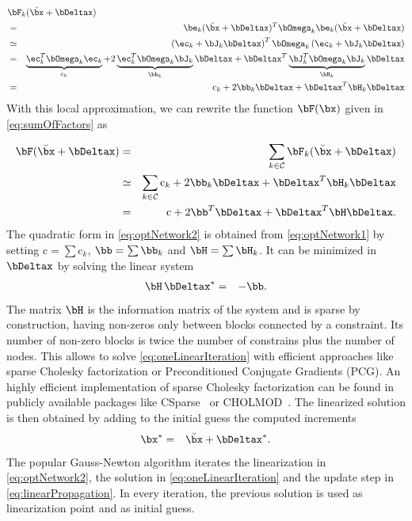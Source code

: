 \documentclass[a4paper]{article}
\begin{document}
\vspace{-3.5mm}
{\small
\begin{eqnarray}
\lefteqn{\bF_{k}(\breve{\bx} + \bDeltax) }\\
&=&  \be_{k}(\breve{\bx} + \bDeltax)^T \bOmega_{k} \be_{k}(\breve{\bx} + \bDeltax)  \\
\label{eq:errorQuad1}
             &\simeq& \left(\ec_{k} + \bJ_{k} \bDeltax \right)^T \bOmega_{k} \left(\ec_{k} + \bJ_{k} \bDeltax \right)  \\
\label{eq:errorQuad2}
             &=& \underbrace{\ec_{k}^T \bOmega_{k}\ec_{k}}_{\mathrm{c}_{k}} + 2 \underbrace{\ec_{k}^T \bOmega_{k} \bJ_{k}}_{\bb_{k}} \bDeltax +
 \bDeltax^T \underbrace{\bJ_{k}^T \bOmega_{k}\bJ_{k}}_{\bH_{k}} \bDeltax \\
             &=&\mathrm{c}_{k} + 2 \bb_{k} \bDeltax + \bDeltax^T \bH_{k} \bDeltax
\label{eq:errorQuad}
\end{eqnarray}
} 
With this local approximation, we can rewrite the function
$\bF(\bx)$ given in \eqref{eq:sumOfFactors} as

\vspace{-3.5mm}
{\small
\begin{eqnarray}
\bF(\breve{\bx} + \bDeltax) &=& \sum_{k \in\mathcal{C}} \bF_{k}(\breve{\bx} + \bDeltax) 
\label{eq:optNetwork0}\\
                      &\simeq& \sum_{k \in\mathcal{C}} \mathrm{c}_{k} + 2 \bb_{k} \bDeltax + \bDeltax^T \bH_{k} \bDeltax
\label{eq:optNetwork1}\\
                      &=&\mathrm{c} + 2 \bb^T \bDeltax + \bDeltax^T \bH \bDeltax. 
\label{eq:optNetwork2}
\end{eqnarray}
} The quadratic form in \eqref{eq:optNetwork2} is obtained from
\eqref{eq:optNetwork1} by setting $\mathrm{c}=\sum \mathrm{c}_{k}$,
$\bb=\sum \bb_{k}$ and $\bH=\sum \bH_{k}$. It can be minimized in
$\bDeltax$ by solving the linear system
\begin{eqnarray}
       \bH\,\bDeltax^* &=& - \bb. 
\label{eq:oneLinearIteration}
\end{eqnarray}
The matrix $\bH$ is the information matrix of the system and is sparse
by construction, having non-zeros only between blocks connected by a
constraint.  Its number of non-zero blocks is twice the number of
constrains plus the number of nodes. This allows to solve
\eqref{eq:oneLinearIteration} with efficient approaches like sparse
Cholesky factorization or Preconditioned Conjugate Gradients (PCG). An
highly efficient implementation of sparse Cholesky factorization can
be found in publicly available packages like CSparse~\cite{csparse} or
CHOLMOD~\cite{cholmod}.  The linearized solution is then obtained by
adding to the initial guess the computed increments
\begin{eqnarray}
  \bx^*&=&\breve{\bx}+\bDeltax^*.
\label{eq:linearPropagation}
\end{eqnarray}
The popular Gauss-Newton algorithm iterates the linearization in
\eqref{eq:optNetwork2}, the solution in \eqref{eq:oneLinearIteration}
and the update step in \eqref{eq:linearPropagation}. In every
iteration, the previous solution is used as linearization point and as
initial guess.
\end{document}
